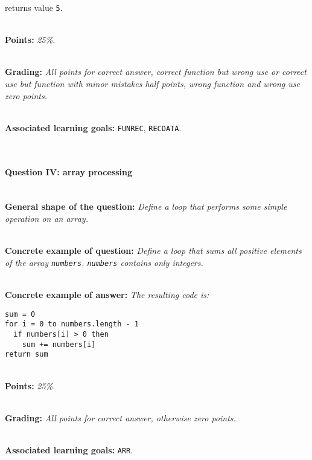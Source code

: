 returns value \texttt{5}.

\ \\ 

\textbf{Points:} \textit{25\%.}

\ \\ 

\textbf{Grading:} \textit{All points for correct answer, correct function but wrong use or correct use but function with minor mistakes half points, wrong function and wrong use zero points.}

\ \\ 

\textbf{Associated learning goals:} \texttt{FUNREC}, \texttt{RECDATA}.

\ \\ 

\paragraph{Question IV: array processing} \ \\

\textbf{General shape of the question:} \textit{Define a loop that performs some simple operation on an array.}

\ \\ 

\textbf{Concrete example of question:} \textit{Define a loop that sums all positive elements of the array \texttt{numbers}. \texttt{numbers} contains only integers.}

\ \\ 

\textbf{Concrete example of answer:} \textit{The resulting code is:}

\begin{lstlisting}
sum = 0
for i = 0 to numbers.length - 1
  if numbers[i] > 0 then
    sum += numbers[i]
return sum
\end{lstlisting}

\ \\ 

\textbf{Points:} \textit{25\%.}

\ \\ 

\textbf{Grading:} \textit{All points for correct answer, otherwise zero points.}

\ \\ 

\textbf{Associated learning goals:} \texttt{ARR}.

\ \\ 

